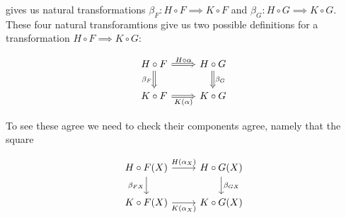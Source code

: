 \documentclass[11pt]{amsart}
\theoremstyle{plain}
\theoremstyle{definition}
\newcommand{\noi}{{\noindent}}
\begin{document}
\noi gives us natural transformations $\beta_F: H\circ F \implies K \circ F$ and $\beta_G: H \circ G \implies K \circ G$. These four natural transforamtions give us two possible definitions for a transformation $H \circ F \implies K \circ G$:

\[ \begin{tikzcd}
  H \circ F 
  \rar[Rightarrow, "H\circ \alpha"]
   \dar[Rightarrow, "\beta_F"'] 
   & H \circ G \dar[Rightarrow, "\beta_G" ] \\
  K \circ F \rar[Rightarrow, "K(\alpha)"'] & K \circ G 
\end{tikzcd}\]

\noi To see these agree we need to check their components agree, namely that the square 

\[ \begin{tikzcd}
  H\circ F (X) \dar["\beta_{FX}"']  \rar["H(\alpha_X)"] & H \circ G (X) \dar["\beta_{GX}"] \\
  K \circ F (X) \rar["K(\alpha_X)"'] & K \circ G (X)
\end{tikzcd}\]
\end{document}
